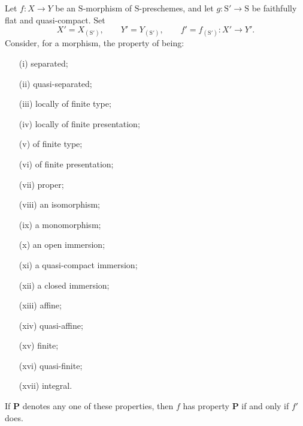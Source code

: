 \begin{proposition}[2.7.1]
\label{IV.2.7.1}
Let $f:X\to Y$ be an $\mathrm{S}$-morphism of $\mathrm{S}$-preschemes,
and let $g:\mathrm{S}'\to\mathrm{S}$ be faithfully flat and
quasi-compact. Set
\[
  X'=X_{(\mathrm{S}')},\qquad
  Y'=Y_{(\mathrm{S}')},\qquad
  f'=f_{(\mathrm{S}')}:X'\to Y'.
\]
Consider, for a morphism, the property of being:
\begin{enumerate}
  \item[(i)] separated;
  \item[(ii)] quasi-separated;
  \item[(iii)] locally of finite type;
  \item[(iv)] locally of finite presentation;
  \item[(v)] of finite type;
  \item[(vi)] of finite presentation;
  \item[(vii)] proper;
  \item[(viii)] \label{IV.2.7.1.viii}an isomorphism;
  \item[(ix)] a monomorphism;
  \item[(x)] an open immersion;
  \item[(xi)] a quasi-compact immersion;
  \item[(xii)] a closed immersion;
  \item[(xiii)] affine;
  \item[(xiv)] quasi-affine;
  \item[(xv)] finite;
  \item[(xvi)] quasi-finite;
  \item[(xvii)] integral.
\end{enumerate}
If $\mathbf{P}$ denotes any one of these properties, then $f$ has
property $\mathbf{P}$ if and only if $f'$ does.
\end{proposition}

